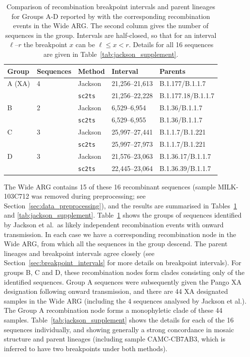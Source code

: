 \documentclass{article}
\begin{document}
\begin{table} \centering
\begin{tabular}{lllll}
\toprule
Group        & Sequences & Method & Interval & Parents \\
\midrule
A (XA)       & 4   & Jackson        &  21,256--21,613 & B.1.177/B.1.1.7 \\
             &     &\texttt{sc2ts} &  21,256--22,228 & B.1.177.18/B.1.1.7 \\
\cmidrule{3-5}
B            & 2   & Jackson        &  6,529--6,954 & B.1.36/B.1.1.7  \\
             &     &\texttt{sc2ts} &  6,529--6,955 & B.1.36/B.1.1.7  \\
\cmidrule{3-5}
C            & 3   &Jackson        &  25,997--27,441 &  B.1.1.7/B.1.221 \\
             &     & \texttt{sc2ts} &  25,997--27,973 &  B.1.1.7/B.1.221 \\
\cmidrule{3-5}
D            & 3   & Jackson        &  21,576--23,063 &  B.1.36.17/B.1.1.7 \\
             &     & \texttt{sc2ts} &  22,445--23,064 &  B.1.36.39/B.1.1.7 \\
\bottomrule
\end{tabular}
\caption{\label{tab:jackson}Comparison of recombination breakpoint
intervals and parent lineages for Groups A-D
reported by \cite{Jackson2021-ik} with the corresponding
recombination events in the Wide ARG.
The second column gives the number of sequences in the group.
Intervals are half-closed, so that for an interval $\ell$--$r$
the breakpoint $x$ can be $\ell \leq x < r$.
Details for all 16 sequences are
given in Table~\ref{tab:jackson_supplement}.}
\end{table}

The Wide ARG contains 15 of these 16 recombinant sequences
(sample MILK-103C712 was removed during preprocessing; see
Section~\ref{sec:data_preprocessing}), and the results are summarised
in Tables~\ref{tab:jackson} and \ref{tab:jackson_supplement}.
Table~\ref{tab:jackson} shows the groups of sequences identified by Jackson
et al.\ as likely independent recombination events with onward transmission.
In each case we have a corresponding recombination node in the Wide ARG,
from which all the sequences in the group descend. The parent lineages
and breakpoint intervals agree closely (see
Section~\ref{sec:breakpoint_intervals} for more details on breakpoint
intervals).
For groups B, C and D,
these recombination nodes form clades consisting only of the identified
sequences.
Group A sequences were subsequently given the Pango XA designation
following onward transmission,
and there are 44 XA designated samples in the Wide ARG (including the
4 sequences analysed by Jackson et al.). The Group A recombination
node forms a monophyletic clade of these 44 samples.
Table~\ref{tab:jackson_supplement} shows the details for each of the
16 sequences individually, and showing generally a strong concordance
in mosaic structure and parent lineages
(including sample CAMC-CB7AB3, which is inferred to have two breakpoints under both
methods).
\end{document}
